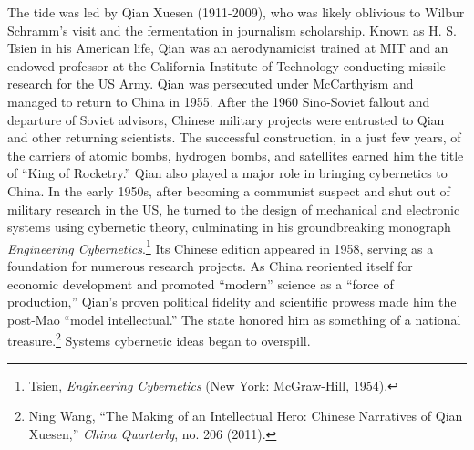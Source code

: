 \documentclass{tufte-handout}
\begin{document}
\begin{CJK*}{UTF8}{gbsn}
The tide was led by Qian Xuesen (1911-2009), who was likely oblivious to
Wilbur Schramm's visit and the fermentation in journalism scholarship.
Known as H. S. Tsien in his American life, Qian was an aerodynamicist
trained at MIT and an endowed professor at the California Institute of
Technology conducting missile research for the US Army. Qian was
persecuted under McCarthyism and managed to return to China in 1955.
After the 1960 Sino-Soviet fallout and departure of Soviet advisors,
Chinese military projects were entrusted to Qian and other returning
scientists. The successful construction, in a just few years, of the
carriers of atomic bombs, hydrogen bombs, and satellites earned him the
title of ``King of Rocketry.'' Qian also played a major role in bringing
cybernetics to China. In the early 1950s, after becoming a communist
suspect and shut out of military research in the US, he turned to the
design of mechanical and electronic systems using cybernetic theory,
culminating in his groundbreaking monograph \emph{Engineering
Cybernetics}.\footnote{Tsien, \emph{Engineering Cybernetics} (New York:
  McGraw-Hill, 1954).} Its Chinese edition appeared in 1958, serving as
a foundation for numerous research projects. As China reoriented itself
for economic development and promoted ``modern'' science as a ``force of
production,'' Qian's proven political fidelity and scientific prowess
made him the post-Mao ``model intellectual.'' The state honored him as
something of a national treasure.\footnote{Ning Wang, ``The Making of an
  Intellectual Hero: Chinese Narratives of Qian Xuesen,'' \emph{China
  Quarterly}, no. 206 (2011).} Systems cybernetic ideas began to
overspill.




\end{CJK*}
\end{document}
